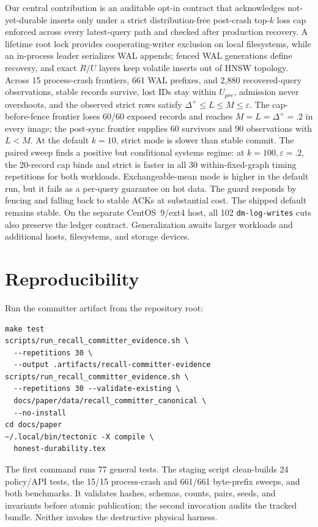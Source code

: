 \documentclass[sigconf,nonacm,balance=false]{acmart}
\begin{document}
Our central contribution is an auditable opt-in contract that acknowledges
not-yet-durable inserts only under a strict distribution-free post-crash top-$k$
loss cap enforced across every latest-query path and checked after production
recovery. A lifetime root lock provides cooperating-writer exclusion on local
filesystems, while an in-process leader serializes WAL appends; fenced WAL
generations define recovery, and
exact $R/U$ layers keep volatile inserts out of HNSW topology. Across 15
process-crash frontiers, 661 WAL prefixes, and 2{,}880 recovered-query observations,
stable records survive, lost IDs stay within $U_{pre}$, admission never overshoots,
and the observed strict rows satisfy $\Delta^+\le L\le M\le\varepsilon$. The
cap-before-fence frontier loses 60/60 exposed records and reaches
$M=L=\Delta^+=.2$ in every image; the post-sync frontier supplies 60 survivors
and 90 observations with $L<M$.
At the default $k=10$, strict mode is slower than stable commit. The paired sweep
finds a positive but conditional systems regime: at $k=100,\varepsilon=.2$, the
20-record cap binds and strict is faster in all 30 within-fixed-graph timing
repetitions for both workloads. Exchangeable-mean mode is higher in the default
run, but it fails as a per-query guarantee on hot data.
The guard responds by fencing and falling back to stable ACKs at substantial cost.
The shipped default remains stable. On the separate CentOS~9/ext4 host, all 102
\texttt{dm-log-writes} cuts also preserve the ledger contract. Generalization
awaits larger workloads and additional hosts, filesystems, and storage devices.

\section*{Reproducibility}
Run the committer artifact from the repository root:
\begin{verbatim}
make test
scripts/run_recall_committer_evidence.sh \
  --repetitions 30 \
  --output .artifacts/recall-committer-evidence
scripts/run_recall_committer_evidence.sh \
  --repetitions 30 --validate-existing \
  docs/paper/data/recall_committer_canonical \
  --no-install
cd docs/paper
~/.local/bin/tectonic -X compile \
  honest-durability.tex
\end{verbatim}
The first command runs 77 general tests. The staging script clean-builds 24
policy/API tests, the 15/15 process-crash and 661/661 byte-prefix sweeps, and both
benchmarks. It validates hashes, schemas, counts, pairs, seeds, and invariants
before atomic publication; the second invocation audits the tracked bundle.
Neither invokes the destructive physical harness.
\end{document}
